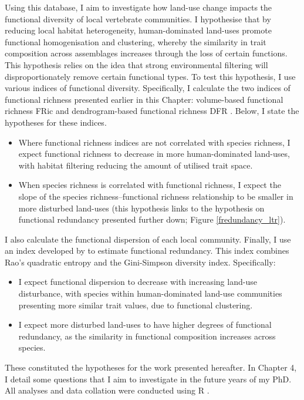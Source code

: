 Using this database, I aim to investigate how land-use change impacts the functional diversity of local vertebrate communities. I hypothesise that by reducing local habitat heterogeneity, human-dominated land-uses promote functional homogenisation and clustering, whereby the similarity in trait composition across assemblages increases through the loss of certain functions. This hypothesis relies on the idea that strong environmental filtering will disproportionately remove certain functional types. To test this hypothesis, I use various indices of functional diversity. Specifically, I calculate the two indices of functional richness presented earlier in this Chapter: volume-based functional richness FRic \citep{Villeger2008} and dendrogram-based functional richness DFR \citep{Petchey2002}. Below, I state the hypotheses for these indices.
\begin{itemize}
\item Where functional richness indices are not correlated with species richness, I expect functional richness to decrease in more human-dominated land-uses, with habitat filtering reducing the amount of utilised trait space. 
\item When species richness is correlated with functional richness, I expect the slope of the species richness--functional richness relationship to be smaller in more disturbed land-uses (this hypothesis links to the hypothesis on functional redundancy presented further down; Figure \ref{fredundancy_ltr}). 
\end{itemize}

I also calculate the functional dispersion \citep{Laliberte2010} of each local community. Finally, I use an index developed by \citet{Ricotta2016} to estimate functional redundancy. This index combines Rao's quadratic entropy and the Gini-Simpson diversity index. Specifically:
\begin{itemize}
\item I expect functional dispersion to decrease with increasing land-use disturbance, with species within human-dominated land-use communities presenting more similar trait values, due to functional clustering.
\item I expect more disturbed land-uses to have higher degrees of functional redundancy, as the similarity in functional composition increases across species.    
\end{itemize}

These constituted the hypotheses for the work presented hereafter. In Chapter 4, I detail some questions that I aim to investigate in the future years of my PhD. All analyses and data collation were conducted using R \citep{R_citation}.
